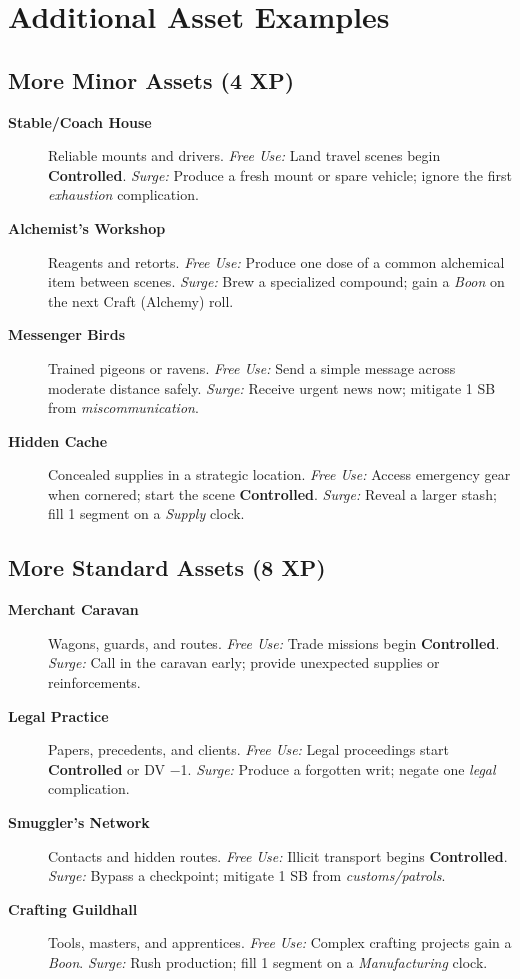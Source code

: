 \section{Additional Asset Examples}

\subsection*{More Minor Assets (4 XP)}
\begin{description}
  \item[\textbf{Stable/Coach House}]  Reliable mounts and drivers. \emph{Free Use:} Land travel scenes begin \textbf{Controlled}. \emph{Surge:} Produce a fresh mount or spare vehicle; ignore the first \emph{exhaustion} complication.
  \item[\textbf{Alchemist's Workshop}]  Reagents and retorts. \emph{Free Use:} Produce one dose of a common alchemical item between scenes. \emph{Surge:} Brew a specialized compound; gain a \emph{Boon} on the next Craft (Alchemy) roll.
  \item[\textbf{Messenger Birds}]  Trained pigeons or ravens. \emph{Free Use:} Send a simple message across moderate distance safely. \emph{Surge:} Receive urgent news now; mitigate 1 SB from \emph{miscommunication}.
  \item[\textbf{Hidden Cache}]  Concealed supplies in a strategic location. \emph{Free Use:} Access emergency gear when cornered; start the scene \textbf{Controlled}. \emph{Surge:} Reveal a larger stash; fill 1 segment on a \emph{Supply} clock.
\end{description}

\subsection*{More Standard Assets (8 XP)}
\begin{description}
  \item[\textbf{Merchant Caravan}]  Wagons, guards, and routes. \emph{Free Use:} Trade missions begin \textbf{Controlled}. \emph{Surge:} Call in the caravan early; provide unexpected supplies or reinforcements.
  \item[\textbf{Legal Practice}]  Papers, precedents, and clients. \emph{Free Use:} Legal proceedings start \textbf{Controlled} or DV −1. \emph{Surge:} Produce a forgotten writ; negate one \emph{legal} complication.
  \item[\textbf{Smuggler's Network}]  Contacts and hidden routes. \emph{Free Use:} Illicit transport begins \textbf{Controlled}. \emph{Surge:} Bypass a checkpoint; mitigate 1 SB from \emph{customs/patrols}.
  \item[\textbf{Crafting Guildhall}]  Tools, masters, and apprentices. \emph{Free Use:} Complex crafting projects gain a \emph{Boon}. \emph{Surge:} Rush production; fill 1 segment on a \emph{Manufacturing} clock.
\end{description}


